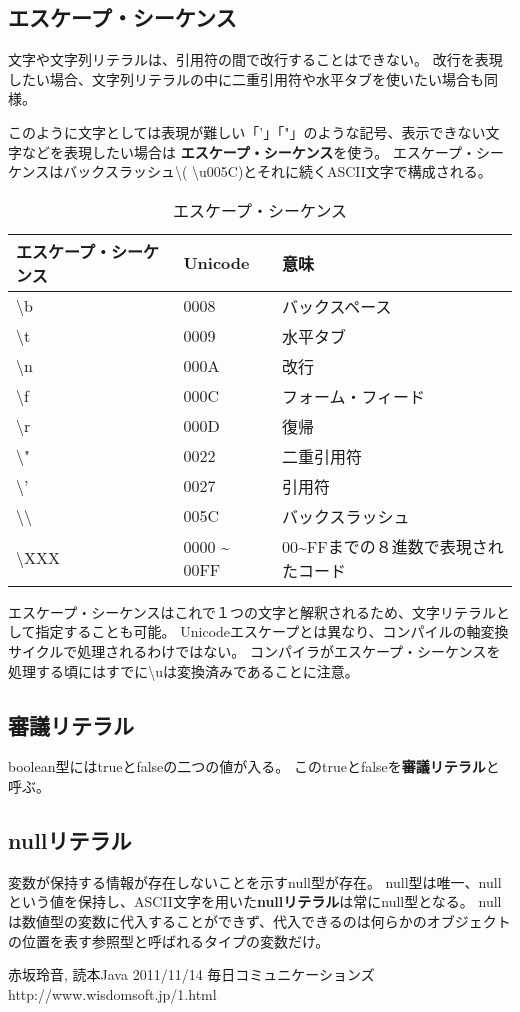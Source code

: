 \documentclass[12pt,a4j,twoside]{jsbook}
\begin{document}
\subsection{エスケープ・シーケンス}
文字や文字列リテラルは、引用符の間で改行することはできない。
改行を表現したい場合、文字列リテラルの中に二重引用符や水平タブを使いたい場合も同様。

このように文字としては表現が難しい「'」「"」のような記号、表示できない文字などを表現したい場合は
\textbf{エスケープ・シーケンス}を使う。
エスケープ・シーケンスはバックスラッシュ\textbackslash ( \textbackslash u005C)とそれに続くASCII文字で構成される。
\begin{table}
    \caption{エスケープ・シーケンス}
    \begin{tabular}{|l|l|l|} \hline
        エスケープ・シーケンス　& Unicode & 意味 \\ \hline
        \textbackslash b & 0008 & バックスペース \\ \hline
        \textbackslash t & 0009 & 水平タブ \\ \hline
        \textbackslash n & 000A & 改行 \\ \hline

        \textbackslash f & 000C & フォーム・フィード \\ \hline
        \textbackslash r & 000D & 復帰 \\ \hline
        \textbackslash " & 0022 & 二重引用符 \\ \hline
        \textbackslash ' & 0027 & 引用符 \\ \hline
        \textbackslash \textbackslash & 005C & バックスラッシュ \\ \hline
        \textbackslash XXX & 0000 \~{} 00FF & 00\~{}FFまでの８進数で表現されたコード \\ \hline
    \end{tabular}
\end{table}
エスケープ・シーケンスはこれで１つの文字と解釈されるため、文字リテラルとして指定することも可能。
Unicodeエスケープとは異なり、コンパイルの軸変換サイクルで処理されるわけではない。
コンパイラがエスケープ・シーケンスを処理する頃にはすでに\textbackslash uは変換済みであることに注意。
\subsection{審議リテラル}
boolean型にはtrueとfalseの二つの値が入る。
このtrueとfalseを\textbf{審議リテラル}と呼ぶ。

\subsection{nullリテラル}
変数が保持する情報が存在しないことを示すnull型が存在。
null型は唯一、nullという値を保持し、ASCII文字を用いた\textbf{nullリテラル}は常にnull型となる。
nullは数値型の変数に代入することができず、代入できるのは何らかのオブジェクトの位置を表す参照型と呼ばれるタイプの変数だけ。

\begin{thebibliography}{9}



赤坂玲音,
読本Java 2011/11/14 毎日コミュニケーションズ
http://www.wisdomsoft.jp/1.html
\end{thebibliography}
\end{document}
